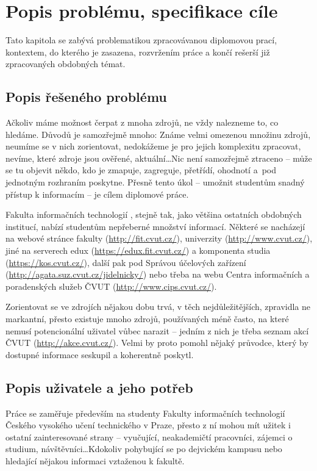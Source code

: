 
\chapter{Popis problému, specifikace cíle}
Tato kapitola se zabývá problematikou zpracovávanou diplomovou prací, kontextem, do kterého je zasazena, rozvržením práce a končí rešerší již zpracovaných obdobných témat.

\section{Popis řešeného problému}
Ačkoliv máme možnost čerpat z mnoha zdrojů, ne vždy nalezneme to, co hledáme. Důvodů je samozřejmě mnoho: Známe velmi omezenou množinu zdrojů, neumíme se v nich zorientovat, nedokážeme je pro jejich komplexitu zpracovat, nevíme, které zdroje jsou ověřené, aktuální\dots Nic není samozřejmě ztraceno -- může se tu objevit někdo, kdo je zmapuje, zagreguje, přetřídí, ohodnotí a~pod jednotným rozhraním poskytne. Přesně tento úkol -- umožnit studentům snadný přístup k informacím -- je cílem diplomové práce.

Fakulta informačních technologií , stejně tak, jako většina ostatních obdobných institucí, nabízí studentům nepřeberné množství informací. Některé se nacházejí na webové stránce fakulty (\url{http://fit.cvut.cz/}), univerzity (\url{http://www.cvut.cz/}), jiné na serverech edux (\url{https://edux.fit.cvut.cz/}) a komponenta studia (\url{https://kos.cvut.cz/}), další pak pod Správou účelových zařízení (\url{http://agata.suz.cvut.cz/jidelnicky/}) nebo třeba na webu Centra informačních a poradenských služeb ČVUT (\url{http://www.cips.cvut.cz/}).

Zorientovat se ve zdrojích nějakou dobu trvá, v těch nejdůležitějších, zpravidla ne markantní, přesto existuje mnoho zdrojů, používaných méně často, na které nemusí potencionální uživatel vůbec narazit -- jedním z nich je třeba seznam akcí ČVUT (\url{http://akce.cvut.cz/}). Velmi by proto pomohl nějaký průvodce, který by dostupné informace seskupil a koherentně poskytl.

\section{Popis uživatele a jeho potřeb}
Práce se zaměřuje především na studenty Fakulty informačních technologií Českého vysokého učení technického v Praze, přesto z ní mohou mít užitek i ostatní zainteresované strany -- vyučující, neakademičtí pracovníci, zájemci o studium, návštěvníci\dots Kdokoliv pohybující se po dejvickém kampusu nebo hledající nějakou informaci vztaženou k fakultě.

